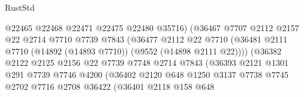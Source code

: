 \begin{lexlean}{RustStd}
\begin{coremodule}
                                      @22465
                                      @22468
                                      @22471
                                      @22475
                                      @22480
                                      @35716)
                                    (@36467
                                      @7707
                                      @2112
                                      @2157
                                      @22
                                      @2714
                                      @7710
                                      @7739
                                      @7843
                                      (@36477
                                        @2112
                                        @22
                                        @7710
                                        (@36481
                                          @2111
                                          @7710
                                          (@14892 (@14893 @7710))
                                          (@9552 (@14898 @2111 @22))))
                                      (@36382
                                        @2122
                                        @2125
                                        @2156
                                        @22
                                        @7739
                                        @7748
                                        @2714
                                        @7843
                                        (@36393
                                          @2121
                                          @1301
                                          @291
                                          @7739
                                          @7746
                                          @4200
                                          (@36402
                                            @2120
                                            @648
                                            @1250
                                            @3137
                                            @7738
                                            @7745
                                            @2702
                                            @7716
                                            @2708
                                            @36422
                                            (@36401
                                              @2118
                                              @158
                                              @648

\end{coremodule}
\end{lexlean}
